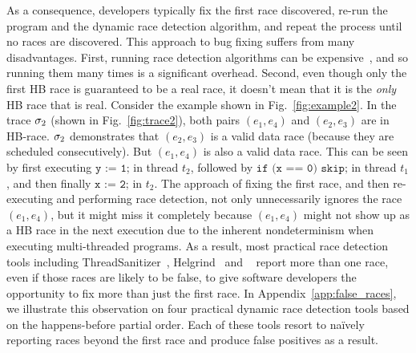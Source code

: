 As a consequence, developers typically fix the first race discovered,
re-run the program and the dynamic race detection algorithm, and
repeat the process until no races are discovered. This approach to bug
fixing suffers from many disadvantages. First, running race detection
algorithms can be expensive~\cite{developersRace14}, and so running
them many times is a significant overhead. Second, even though only
the first HB race is guaranteed to be a real race, it doesn't mean
that it is the \emph{only} HB race that is real. Consider the example
shown in Fig.~\ref{fig:example2}. In the trace $\sigma_2$ (shown in
Fig.~\ref{fig:trace2}), both pairs $(e_1,e_4)$ and $(e_2,e_3)$ are in
HB-race. $\sigma_2$ demonstrates that $(e_2,e_3)$ is a valid data race
(because they are scheduled consecutively). But $(e_1,e_4)$ is also a
valid data race. This can be seen by first executing $\texttt{y :=
1;}$ in thread $t_2$, followed by $\texttt{if (x == 0) skip;}$ in
thread $t_1$, and then finally $\texttt{x := 2;}$ in $t_2$. The
approach of fixing the first race, and then re-executing and
performing race detection, not only unnecessarily ignores the race
$(e_1,e_4)$, but it might miss it completely because $(e_1,e_4)$ might
not show up as a HB race in the next execution due to the inherent
nondeterminism when executing multi-threaded programs.  As a result,
most practical race detection tools including
ThreadSanitizer~\cite{threadsanitizer}, Helgrind~\cite{helgrind}
and \fasttrack~\cite{fasttrack} report more than one race, even if
those races are likely to be false, to give software developers the
opportunity to fix more than just the first race.
In Appendix~\ref{app:false_races}, we illustrate
this observation on four practical dynamic race detection tools
based on the happens-before partial order. Each of these tools
resort to  na\"ively reporting races beyond the first race and produce
false positives as a result.

